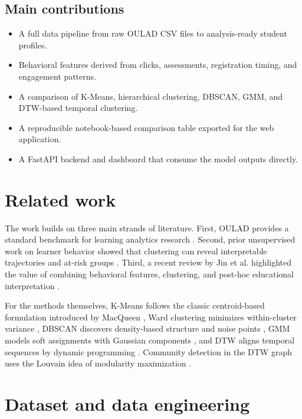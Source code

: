 \documentclass[11pt,a4paper]{article}
\begin{document}
\subsection{Main contributions}
\begin{itemize}[leftmargin=*]
  \item A full data pipeline from raw OULAD CSV files to analysis-ready student profiles.
  \item Behavioral features derived from clicks, assessments, registration timing, and engagement patterns.
  \item A comparison of K-Means, hierarchical clustering, DBSCAN, GMM, and DTW-based temporal clustering.
  \item A reproducible notebook-based comparison table exported for the web application.
  \item A FastAPI backend and dashboard that consume the model outputs directly.
\end{itemize}

\section{Related work}
The work builds on three main strands of literature. First, OULAD provides a standard benchmark for learning analytics research \citep{kuzilek2017oulad}. Second, prior unsupervised work on learner behavior showed that clustering can reveal interpretable trajectories and at-risk groups \citep{peach2019unsupervised}. Third, a recent review by Jin et al. highlighted the value of combining behavioral features, clustering, and post-hoc educational interpretation \citep{jin2024review}.

For the methods themselves, K-Means follows the classic centroid-based formulation introduced by MacQueen \citep{macqueen1967}, Ward clustering minimizes within-cluster variance \citep{ward1963}, DBSCAN discovers density-based structure and noise points \citep{ester1996dbscan}, GMM models soft assignments with Gaussian components \citep{bishop2006prml}, and DTW aligns temporal sequences by dynamic programming \citep{sakoe1978dtw}. Community detection in the DTW graph uses the Louvain idea of modularity maximization \citep{blondel2008louvain}.

\section{Dataset and data engineering}
\end{document}
